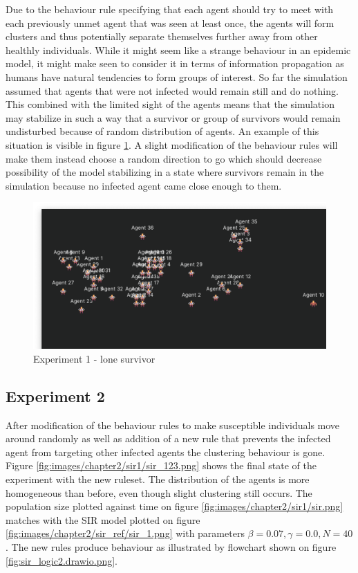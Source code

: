 Due to the behaviour rule specifying that each agent should try to meet with each previously unmet agent that was seen at least once, the agents will form clusters and thus potentially separate themselves further away from other healthly individuals.
While it might seem like a strange behaviour in an epidemic model, it might make seen to consider it in terms of information propagation as humans have natural tendencies to form groups of interest.
So far the simulation assumed that agents that were not infected would remain still and do nothing.
This combined with the limited sight of the agents means that the simulation may stabilize in such a way that a survivor or group of survivors would remain undisturbed because of random distribution of agents.
An example of this situation is visible in figure \ref{fig:images/chapter2/sir0/sir_255.png}.
A slight modification of the behaviour rules will make them instead choose a random direction to go which should decrease possibility of the model stabilizing in a state where survivors remain in the simulation because no infected agent came close enough to them.

\begin{figure}[H]
    \centering
    \includegraphics[width=1.0\textwidth]{images/chapter2/sir0/sir_255.png}
    \caption{Experiment 1 - lone survivor}\label{fig:images/chapter2/sir0/sir_255.png}
\end{figure}

\subsection{Experiment 2}

After modification of the behaviour rules to make susceptible individuals move around randomly as well as addition of a new rule that prevents the infected agent from targeting other infected agents the clustering behaviour is gone.
Figure \ref{fig:images/chapter2/sir1/sir_123.png} shows the final state of the experiment with the new ruleset.
The distribution of the agents is more homogeneous than before, even though slight clustering still occurs.
The population size plotted against time on figure \ref{fig:images/chapter2/sir1/sir.png} matches with the SIR model plotted on figure \ref{fig:images/chapter2/sir_ref/sir_1.png} with parameters $\beta = 0.07, \gamma = 0.0, N = 40$.
The new rules produce behaviour as illustrated by flowchart shown on figure \ref{fig:sir_logic2.drawio.png}.

